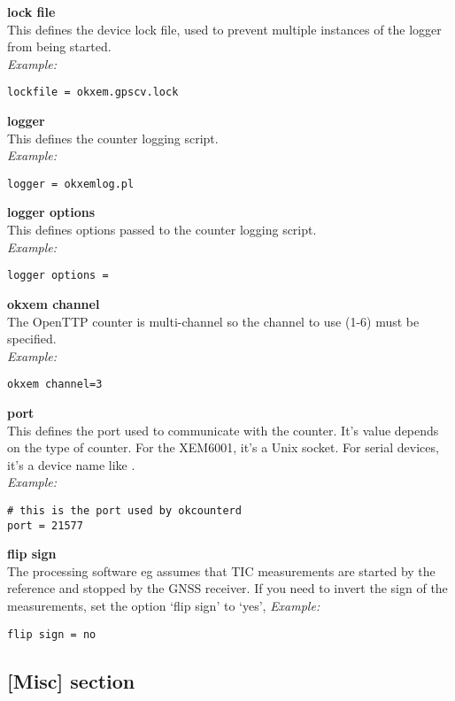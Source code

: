 {\bfseries lock file}\\
This defines the device lock file, used to prevent multiple instances of the logger
from being started.\\
\textit{Example:}
\begin{lstlisting}
lockfile = okxem.gpscv.lock
\end{lstlisting}

{\bfseries logger}\\
This defines the counter logging script.\\
\textit{Example:}
\begin{lstlisting}
logger = okxemlog.pl
\end{lstlisting}

{\bfseries logger options}\\
This defines options passed to the counter logging script.\\
\textit{Example:}
\begin{lstlisting}
logger options =
\end{lstlisting}

{\bfseries okxem channel}\\
The OpenTTP counter is multi-channel so the channel to use (1-6) must be specified.\\
\textit{Example:}
\begin{lstlisting}
okxem channel=3
\end{lstlisting}

{\bfseries port}\\
This defines the port used to communicate with the counter. It's value depends on the type of counter. 
For the XEM6001, it's a Unix socket. For serial devices, it's a device name like
.\\
\textit{Example:}
\begin{lstlisting}
# this is the port used by okcounterd
port = 21577 
\end{lstlisting}

{\bfseries flip sign}\\
The processing software eg  assumes that TIC measurements are started by the reference
and stopped by the GNSS receiver. If you need to invert the sign of the measurements, set the option
`flip sign' to `yes',
\textit{Example:}
\begin{lstlisting}
flip sign = no 
\end{lstlisting}

\subsection{[Misc] section}

